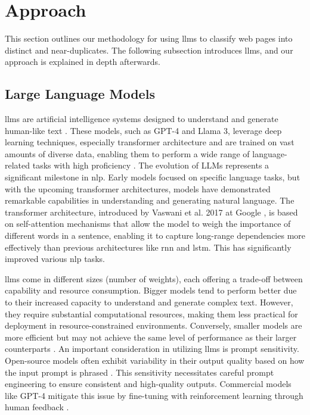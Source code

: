 \section{Approach}

    This section outlines our methodology for using \acp{llm} to classify web pages into distinct and near-duplicates. The following subsection introduces \acp{llm}, and our approach is explained in depth afterwards.

\subsection{Large Language Models}
    \label{sec:approach:sub:llm}

    \acp{llm} are artificial intelligence systems designed to understand and generate human-like text \cite{vaswani_attention_2017}. These models, such as GPT-4 and Llama 3, leverage deep learning techniques, especially transformer architecture and are trained on vast amounts of diverse data, enabling them to perform a wide range of language-related tasks with high proficiency \cite{touvron_llama_2023,openai_gpt-4_2024}. The evolution of LLMs represents a significant milestone in \ac{nlp}. Early models focused on specific language tasks, but with the upcoming transformer architectures, models have demonstrated remarkable capabilities in understanding and generating natural language. The transformer architecture, introduced by Vaswani et al. 2017 at Google \cite{vaswani_attention_2017}, is based on self-attention mechanisms that allow the model to weigh the importance of different words in a sentence, enabling it to capture long-range dependencies more effectively than previous architectures like \ac{rnn} and \ac{lstm}. This has significantly improved various \ac{nlp} tasks.
    
    \acp{llm} come in different sizes (number of weights), each offering a trade-off between capability and resource consumption. Bigger models tend to perform better due to their increased capacity to understand and generate complex text. However, they require substantial computational resources, making them less practical for deployment in resource-constrained environments. Conversely, smaller models are more efficient but may not achieve the same level of performance as their larger counterparts \cite{brown_language_2020}. An important consideration in utilizing \acp{llm} is prompt sensitivity. Open-source models often exhibit variability in their output quality based on how the input prompt is phrased \cite{sclar_quantifying_2024}. This sensitivity necessitates careful prompt engineering to ensure consistent and high-quality outputs. Commercial models like GPT-4 mitigate this issue by fine-tuning with reinforcement learning through human feedback \cite{openai_gpt-4_2024}. 
    
